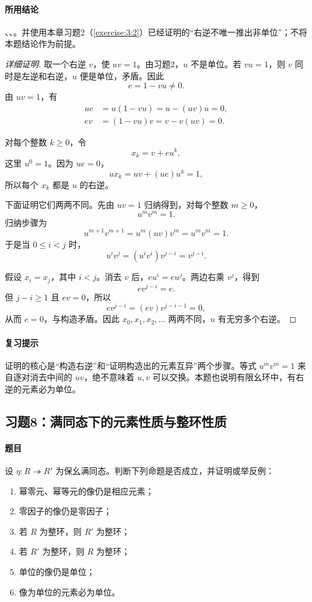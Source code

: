 \paragraph{所用结论}、、。并使用本章习题2（\ref{exercise:3:2}）已经证明的“右逆不唯一推出非单位”；不将本题结论作为前提。
\begin{proof}[详细证明]
取一个右逆 $v$，使 $uv=1$。由习题2，$u$ 不是单位。若 $vu=1$，则 $v$ 同时是左逆和右逆，$u$ 便是单位，矛盾。因此
\[
e=1-vu\ne0.
\]
由 $uv=1$，有
\begin{align*}
ue&=u(1-vu)=u-(uv)u=0,\\
ev&=(1-vu)v=v-v(uv)=0.
\end{align*}

对每个整数 $k\ge0$，令
\[
x_k=v+eu^k,
\]
这里 $u^0=1$。因为 $ue=0$，
\[
ux_k=uv+(ue)u^k=1,
\]
所以每个 $x_k$ 都是 $u$ 的右逆。

下面证明它们两两不同。先由 $uv=1$ 归纳得到，对每个整数 $m\ge0$，
\[
u^mv^m=1.
\]
归纳步骤为
\[
u^{m+1}v^{m+1}=u^m(uv)v^m=u^mv^m=1.
\]
于是当 $0\le i<j$ 时，
\[
u^iv^j=(u^iv^i)v^{j-i}=v^{j-i}.
\]

假设 $x_i=x_j$，其中 $i<j$。消去 $v$ 后，$eu^i=eu^j$。两边右乘 $v^j$，得到
\[
ev^{j-i}=e.
\]
但 $j-i\ge1$ 且 $ev=0$，所以
\[
ev^{j-i}=(ev)v^{j-i-1}=0,
\]
从而 $e=0$，与构造矛盾。因此 $x_0,x_1,x_2,\ldots$ 两两不同，$u$ 有无穷多个右逆。
\end{proof}

\paragraph{复习提示}
证明的核心是“构造右逆”和“证明构造出的元素互异”两个步骤。等式 $u^mv^m=1$ 来自逐对消去中间的 $uv$，绝不意味着 $u,v$ 可以交换。本题也说明有限幺环中，有右逆的元素必为单位。

\subsection{习题8：满同态下的元素性质与整环性质}\label{exercise:3:8}
\paragraph{题目}
设 $\eta:R\twoheadrightarrow R'$ 为保幺满同态。判断下列命题是否成立，并证明或举反例：
\begin{enumerate}
  \item[(i)] 幂零元、幂等元的像仍是相应元素；
  \item[(ii)] 零因子的像仍是零因子；
  \item[(iii)] 若 $R$ 为整环，则 $R'$ 为整环；
  \item[(iv)] 若 $R'$ 为整环，则 $R$ 为整环；
  \item[(v)] 单位的像仍是单位；
  \item[(vi)] 像为单位的元素必为单位。
\end{enumerate}

